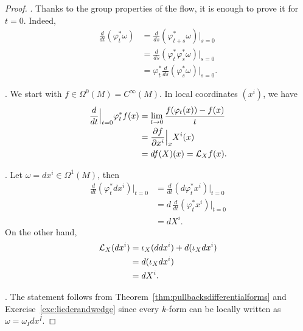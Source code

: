 \begin{proof}
	.
	Thanks to the group properties of the flow, it is enough to prove it for $t=0$.
	Indeed,
	\begin{align}
		\frac{d}{dt}(\varphi_t^* \omega)
		 & = \frac{d}{ds}(\varphi_{t+s}^* \omega)\Big|_{s=0}         \\
		 & = \frac{d}{ds}(\varphi_t^*\varphi_s^*\omega)\Big|_{s=0}   \\
		 & = \varphi^*_t \frac{d}{ds}(\varphi_s^*\omega)\Big|_{s=0}.
	\end{align}

	.
	We start with $f\in\Omega^0(M) = C^\infty(M)$.
	In local coordinates $(x^i)$, we have
	\begin{align}
		\frac{d}{dt}\Big|_{t=0}\varphi_t^* f(x)
		 & = \lim_{t\to0} \frac{f(\varphi_t(x)) - f(x)}{t} \\
		 & = \frac{\partial f}{\partial x^i}\Big|_x X^i(x) \\
		 & = df(X)(x) = \mathcal{L}_X f(x).
	\end{align}

	. Let $\omega = dx^i \in \Omega^1(M)$, then
	\begin{align}
		\frac{d}{dt}(\varphi_t^* dx^i)\Big|_{t=0}
		 & = \frac{d}{dt}(d\varphi_t^* x^i)\Big|_{t=0}    \\
		 & = d\, \frac{d}{dt}(\varphi_t^* x^i)\Big|_{t=0} \\
		 & = dX^i.
	\end{align}
	On the other hand,
	\begin{align}
		\mathcal{L}_X(dx^i)
		 & = \iota_X(ddx^i) + d(\iota_X dx^i) \\
		 & = d(\iota_X dx^i)                  \\
		 & = dX^i.
	\end{align}

	. The statement follows from Theorem~\ref{thm:pullbacksdifferentialforms} and Exercise~\ref{exe:liederandwedge} since every $k$-form can be locally written as $\omega = \omega_I dx^I$.
\end{proof}

